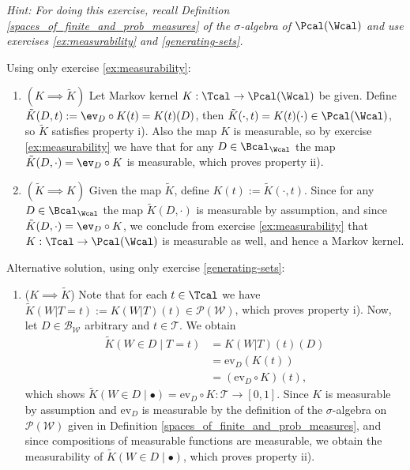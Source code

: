 \begin{enumerate}
    \emph{Hint: For doing this exercise, recall Definition \ref*{spaces_of_finite_and_prob_measures} of the $\sigma$-algebra of $\Pcal(\Wcal)$ and use exercises \ref*{ex:measurability} and \ref*{generating-sets}.}
    \begin{gradedsolution}
        Using only exercise \ref*{ex:measurability}:
        \begin{enumerate}
            \item {} $(K\implies \tilde{K})$ Let Markov kernel $K: \Tcal \to \Pcal(\Wcal)$ be given. Define $\tilde{K}(D, t) := \ev_D \circ K(t) = K(t)(D)$, then $\tilde{K}(\cdot, t) = K(t)(\cdot) \in \Pcal(\Wcal)$, so $\tilde{K}$ satisfies property i). Also the map $K$ is measurable, so by exercise \ref{ex:measurability} we have that for any $D\in \Bcal_{\Wcal}$ the map $\tilde{K}(D, \cdot) = \ev_D\circ K$ is measurable, which proves property ii).
            \item {} $(\tilde{K}\implies K)$ Given the map $\tilde{K}$, define $K(t) := \tilde{K}(\cdot, t)$. Since for any $D\in \Bcal_{\Wcal}$ the map $\tilde{K}(D, \cdot)$ is measurable by assumption, and since $\tilde{K}(D, \cdot) = \ev_D \circ K$, we conclude from exercise \ref{ex:measurability} that $K:\Tcal \to \Pcal(\Wcal)$ is measurable as well, and hence a Markov kernel.
        \end{enumerate}
    \end{gradedsolution}
    \begin{gradedsolution}
        Alternative solution, using only exercise \ref*{generating-sets}:
        \begin{enumerate}
            \item {} ($K\implies \tilde{K}$) Note that for each $t\in\Tcal$ we have $\tilde{K}(W | T=t) := K(W|T)(t) \in \mathcal{P}(\mathcal{W})$, which proves property i).
            Now, let $D \in \mathcal{B}_{\mathcal{W}}$ arbitrary and $t \in \mathcal{T}$.
            We obtain
            \begin{align*}
                \tilde{K}(W\in D \mid T=t) & = K(W|T)(t)(D)              \\
                                           & = \text{ev}_D(K(t))         \\
                                           & = (\text{ev}_D \circ K)(t),
            \end{align*}
            which shows $\tilde{K}(W\in D \mid \bullet) = \text{ev}_D \circ K: \mathcal{T} \to [0,1]$.
            Since $K$ is measurable by assumption and $\text{ev}_D$ is measurable by the definition of the $\sigma$-algebra on $\mathcal{P}(\mathcal{W})$ given in Definition \ref*{spaces_of_finite_and_prob_measures}, and since compositions of measurable functions are measurable, we obtain the measurability of $\tilde{K}(W\in D \mid \bullet)$, which proves property ii).


\end{enumerate}
\end{gradedsolution}
\end{enumerate}
